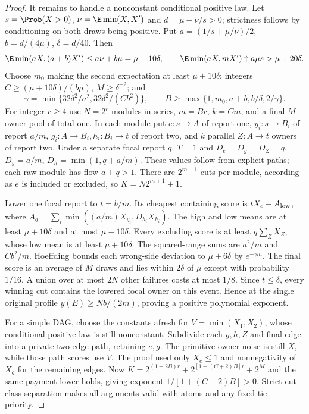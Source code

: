 \begin{proof}
It remains to handle a nonconstant conditional positive law. Let
$s=\Prob(X>0)$, $\nu=\E\min(X,X')$ and $d=\mu-\nu/s>0$;
strictness follows by conditioning on both draws being positive. Put
$a=(1/s+\mu/\nu)/2$, $b=d/(4\mu)$, $\delta=d/40$.
Then
\[
 \E\min(aX,(a+b)X')\le a\nu+b\mu=\mu-10\delta,
 \qquad \E\min(aX,mX')\uparrow a\mu s>\mu+20\delta.
\]
Choose $m_0$ making the second expectation at least $\mu+10\delta$;
integers $C\ge(\mu+10\delta)/(b\mu)$, $M\ge\delta^{-2}$; and
\[
 \gamma=\min\{32\delta^2/a^2,32\delta^2/(Cb^2)\},\qquad
 B\ge\max\{1,m_0,a+b,b/\delta,2/\gamma\}.
\]
For integer $r\ge4$ use $N=2^r$ modules in series, $m=Br$,
$k=Cm$, and a final $M$-owner pool of total one. In each module put
$e:s\to A$ of report one, $y_i:s\to B_i$ of report $a/m$,
$g_i:A\to B_i,h_i:B_i\to t$ of report two, and $k$ parallel
$Z:A\to t$ owners of report two. Under a separate focal report $q$,
$T=1$ and
$D_e=D_g=D_Z=q$, $D_y=a/m$, $D_h=\min(1,q+a/m)$.
These values follow from explicit paths; each raw module has flow $a+q>1$.
There are $2^{m+1}$ cuts per module, according as $e$ is included or
excluded, so $K=N2^{m+1}+1$.

Lower one focal report to $t=b/m$. Its cheapest containing score is
$tX_e+A_{\rm low}$, where
$A_q=\sum_i\min((a/m)X_{y_i},D_{h_i}X_{h_i})$.
The high and low means are at least $\mu+10\delta$ and at most
$\mu-10\delta$. Every excluding score is at least $q\sum_ZX_Z$,
whose low mean is at least $\mu+10\delta$.
The squared-range sums are $a^2/m$ and $Cb^2/m$. Hoeffding bounds each
wrong-side deviation to $\mu\pm6\delta$ by $e^{-\gamma m}$.
The final score is an average of $M$ draws and lies within $2\delta$
of $\mu$ except with probability $1/16$. A union over at most $2N$
other failures costs at most $1/8$. Since $t\le\delta$, every winning
cut contains the lowered focal owner on this event. Hence at the single
original profile $y(E)\ge Nb/(2m)$, proving a positive polynomial exponent.

For a simple DAG, choose the constants afresh for $V=\min(X_1,X_2)$,
whose conditional positive law is still nonconstant. Subdivide each
$y,h,Z$ and final edge into a private two-edge path, retaining $e,g$.
The primitive owner noise is still $X$, while those path scores use $V$.
The proof used only $X_e\le1$ and nonnegativity of $X_g$ for the remaining
edges. Now
$K=2^{(1+2B)r}+2^{[1+(C+2)B]r}+2^M$ and the same payment lower holds,
giving exponent $1/[1+(C+2)B]>0$. Strict cut-class separation makes all
arguments valid with atoms and any fixed tie priority.
\end{proof}

